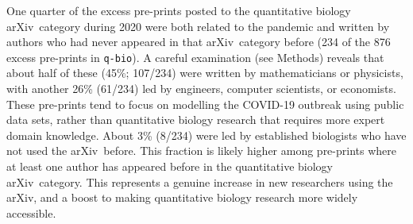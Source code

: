 \documentclass[]{rsos}%
\newcommand{\arxiv}{arXiv}
\newcommand{\change}[1]{#1}
\begin{document}
One quarter of the excess pre-prints posted to \change{the quantitative biology \arxiv\ category} during 2020 were both related to the pandemic and written by authors who had never appeared in \change{that \arxiv\ category before} (234 of the 876 excess pre-prints in \texttt{q-bio}). A careful examination \change{(see Methods)} reveals that about half of these (45\%; 107/234) were written by mathematicians or physicists, with another 26\% (61/234) led by engineers, computer scientists, or economists. These pre-prints tend to focus on modelling the COVID-19 outbreak using public data sets, rather than quantitative biology research that requires more expert domain knowledge. About 3\% (8/234) were led by established biologists who have not used the \arxiv\ before. This fraction is likely higher among pre-prints where at least one author has appeared before in the quantitative biology \change{\arxiv\ category}. This represents a genuine increase in new researchers using the \arxiv, and a boost to making quantitative biology research more widely accessible. 











\end{document}
